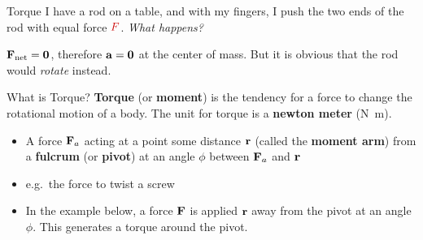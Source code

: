 \documentclass[12pt,compress,aspectratio=169]{beamer}
\newcommand{\mb}[1]{\ensuremath\mathbf{#1}}
\begin{document}
\begin{frame}{Torque}
  I have a rod on a table, and with my fingers, I push the two ends of the rod
  with equal force $\textcolor{red!80!black}{F}$. \emph{What happens?}
  \begin{center}
  \end{center}
  $\mb{F}_\text{net}=\mb{0}$, therefore $\mb{a}=\mb{0}$ at the center of mass.
  But it is obvious that the rod would \emph{rotate} instead.
\end{frame}



\begin{frame}{What is Torque?}
  \textbf{Torque} (or \textbf{moment}) is the tendency for a force to change
  the rotational motion of a body. The unit for torque is a
  \textbf{newton meter} (\si{\newton\metre}).
  \begin{itemize}
  \item A force $\mb{F}_a$ acting at a point some distance $\mb{r}$ (called the
    \textbf{moment arm}) from a \textbf{fulcrum} (or \textbf{pivot}) at an angle
    $\phi$ between $\mb{F}_a$ and $\mb{r}$
  \item e.g.\ the force to twist a screw
  \item In the example below, a force $\mb{F}$ is applied $\mb{r}$ away from
    the pivot at an angle $\phi$. This generates a torque around the pivot.
  \end{itemize}
  \begin{center}
  \end{center}
\end{frame}
\end{document}
